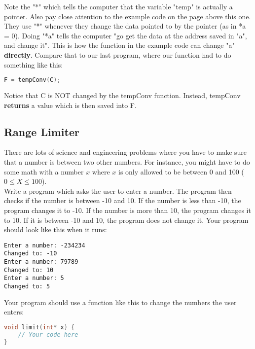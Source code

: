 \documentclass[a4paper,12pt]{article} %
\begin{document}
\noindent
Note the "*" which tells the computer that the variable "temp" is actually a pointer. Also pay close attention to the example code on the page above this one. They use "*" whenever they change the data pointed to by the pointer (as in *a = 0). Doing "*a" tells the computer "go get the data at the address saved in "a", and change it". This is how the function in the example code can change "a" \textbf{directly}. Compare that to our last program, where our function had to do something like this:

\vspace{5mm}
\begin{lstlisting}[language=C++]
F = tempConv(C);
\end{lstlisting}

\noindent
Notice that C is NOT changed by the tempConv function. Instead, tempConv \textbf{returns} a value which is then saved into F. 

\subsection{Range Limiter}

There are lots of science and engineering problems where you have to make sure that a number is between two other numbers. For instance, you might have to do some math with a number $x$ where $x$ is only allowed to be between 0 and 100 ($0 \le X \le 100$).\\

\noindent
Write a program which asks the user to enter a number. The program then checks if the number is between -10 and 10. If the number is less than -10, the program changes it to -10. If the number is more than 10, the program changes it to 10. If it is between -10 and 10, the program does not change it. Your program should look like this when it runs:

\begin{verbatim}
Enter a number: -234234
Changed to: -10
Enter a number: 79789
Changed to: 10
Enter a number: 5
Changed to: 5
\end{verbatim}

\noindent
Your program should use a function like this to change the numbers the user enters:

\vspace{5mm}
\begin{lstlisting}[language=C++]
void limit(int* x) {
	// Your code here
}
\end{lstlisting}
\end{document}
